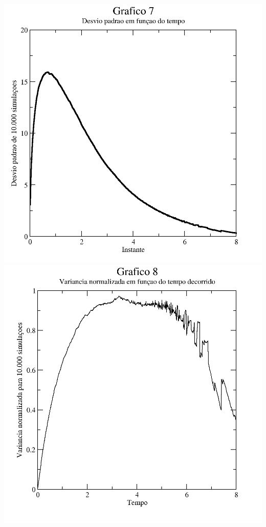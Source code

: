 \message{ !name(relatorio.tex)}\documentclass{article}
\begin{document}
\includegraphics[width=\textwidth]{graf7}
\includegraphics[width=\textwidth]{graf8}
\end{document}
